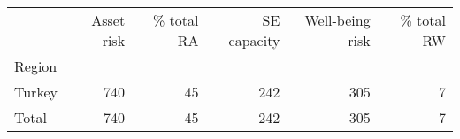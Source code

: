 \begin{tabular}{lrrrrr}
\toprule
{} &  Asset risk &  \% total RA &  SE capacity &  Well-being risk &  \% total RW \\
Region &             &             &              &                  &             \\
\midrule
Turkey &         740 &          45 &          242 &              305 &           7 \\
Total  &         740 &          45 &          242 &              305 &           7 \\
\bottomrule
\end{tabular}

